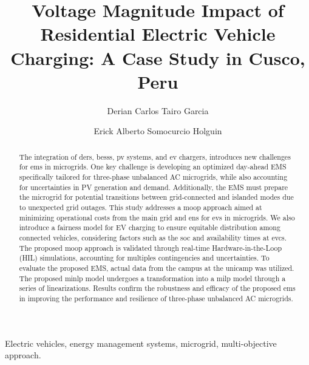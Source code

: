\documentclass[12pt, 3p]{elsarticle}
\begin{document}
\begin{frontmatter}

    \title{Voltage Magnitude Impact of Residential Electric Vehicle Charging: 
    A Case Study in Cusco, Peru}

    \author[1]{Derian Carlos Tairo Garcia}

    \author[1]{Erick Alberto Somocurcio Holguin} 




    
    \begin{abstract}
        The integration of \glspl{der}, \glspl{bess}, \gls{pv} systems, 
        and \gls{ev} chargers, introduces new challenges for \gls{ems} in
        microgrids.
        One key challenge is developing an optimized day-ahead EMS specifically 
        tailored for three-phase unbalanced AC microgrids, while also 
        accounting for uncertainties in PV generation and demand. 
        Additionally, the EMS must prepare the microgrid for potential 
        transitions between grid-connected and islanded modes due to 
        unexpected grid outages.
        This study addresses a \gls{moop} approach aimed at minimizing 
        operational costs from the main grid and \gls{ens} for \glspl{ev} 
        in microgrids. 
        We also introduce a fairness model for EV charging to ensure 
        equitable distribution among connected vehicles, considering factors 
        such as the \gls{soc} and availability times at \gls{evcs}.
        The proposed \gls{moop} approach is validated through real-time 
        Hardware-in-the-Loop (HIL) simulations, accounting for multiples 
        contingencies and uncertainties.
        To evaluate the proposed EMS, actual data from the \Gls{campus} 
        at the \gls{unicamp} was utilized. 
        The proposed \gls{minlp} model undergoes a
        transformation into a \gls{milp} model through a 
        series of linearizations. Results confirm the robustness and efficacy 
        of the proposed \gls{ems} in improving the performance and resilience 
        of three-phase unbalanced AC microgrids.
    \end{abstract}
    \begin{keyword}
        Electric vehicles, energy management systems, microgrid, 
        multi-objective approach.
    \end{keyword}
\end{frontmatter}
\end{document}
